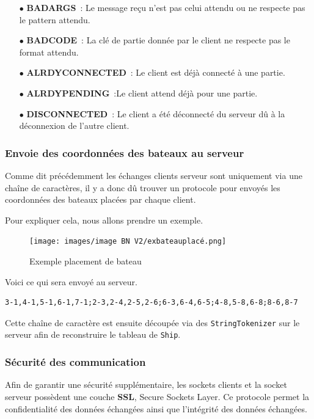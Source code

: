\documentclass[12pt]{article}
\begin{document}
\begin{itemize}
      \item[$\bullet$] \textbf{BADARGS} : Le message reçu n'est pas celui
            attendu ou ne
            respecte pas le pattern attendu.
            \bigskip
      \item[$\bullet$] \textbf{BADCODE} : La clé de partie donnée par le client
            ne respecte pas le format attendu.
            \bigskip
      \item[$\bullet$] \textbf{ALRDYCONNECTED} : Le client est déjà connecté à
            une partie.
            \bigskip
      \item[$\bullet$] \textbf{ALRDYPENDING} :Le client attend déjà pour une
            partie.
            \bigskip
      \item [$\bullet$] \textbf{DISCONNECTED} : Le client a été déconnecté du
            serveur dû à la déconnexion de l'autre client.
\end{itemize}

\bigskip

\subsubsection{Envoie des coordonnées des bateaux au serveur}
Comme dit précédemment les échanges clients serveur sont uniquement via une
chaîne de caractères, il y a donc dû trouver un protocole pour envoyés les
coordonnées des bateaux placées par chaque client.

Pour expliquer cela, nous allons prendre un exemple.
\begin{figure}[H]
      \centering
      \texttt{[image: images/image BN V2/exbateauplacé.png]}
      \caption{Exemple placement de bateau}
\end{figure}
Voici ce qui sera envoyé au serveur.
\begin{verbatim}
3-1,4-1,5-1,6-1,7-1;2-3,2-4,2-5,2-6;6-3,6-4,6-5;4-8,5-8,6-8;8-6,8-7
\end{verbatim}
Cette chaîne de caractère est ensuite découpée via des \texttt{StringTokenizer}
sur le serveur afin de reconstruire le tableau de \texttt{Ship}.

\bigskip

\subsubsection{Sécurité des communication}
Afin de garantir une sécurité supplémentaire, les sockets clients et la socket
serveur possèdent une couche \textbf{SSL}, Secure Sockets Layer. Ce protocole
permet la confidentialité des données échangées ainsi que l'intégrité des
données échangées.
\end{document}
